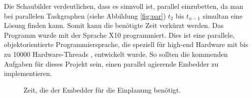 Die Schaubilder verdeutlichen, dass es sinnvoll ist, parallel einzubetten, da man bei parallelen Taskgraphen (siehe Abbildung \ref{fig:par}) $t_2$ bis $t_{n-1}$ simultan eine Lösung finden kann. Somit kann die benötigte Zeit verkürzt werden. Das Programm wurde mit der Sprache  X10 \cite{x10}  programmiert. Dies ist eine parallele, objektorientierte Programmiersprache, die speziell für high-end Hardware mit bis zu 10000 Hardware-Threads \cite{x10Spezi} , entwickelt wurde. So sollten die  kommenden Aufgaben für dieses Projekt sein, einen parallel agierende Embedder zu implementieren.
\begin{figure}
\centering
\caption{Zeit, die der Embedder für die Einplanung benötigt.}
\label{einbettungszeit}
\end{figure}  





